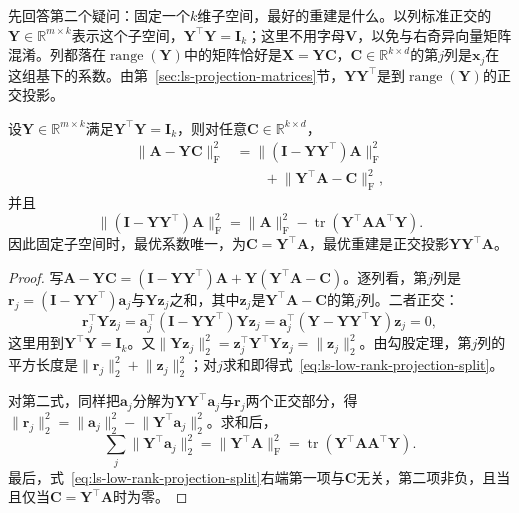 先回答第二个疑问：固定一个$k$维子空间，最好的重建是什么。以列标准正交的$\bm Y\in\mathbb R^{m\times k}$表示这个子空间，$\bm Y^\top\bm Y=\bm I_k$；这里不用字母$\bm V$，以免与右奇异向量矩阵混淆。列都落在$\operatorname{range}(\bm Y)$中的矩阵恰好是$\bm X=\bm Y\bm C$，$\bm C\in\mathbb R^{k\times d}$的第$j$列是$\bm x_j$在这组基下的系数。由第~\ref{sec:ls-projection-matrices}节，$\bm Y\bm Y^\top$是到$\operatorname{range}(\bm Y)$的正交投影。

\begin{lemma}[固定子空间时的正交误差分解]
\label{lem:ls-low-rank-projection-error}
设$\bm Y\in\mathbb R^{m\times k}$满足$\bm Y^\top\bm Y=\bm I_k$，则对任意$\bm C\in\mathbb R^{k\times d}$，
\begin{equation}
 \begin{aligned}
 \lVert\bm A-\bm Y\bm C\rVert_{\mathrm F}^2
 &=\lVert(\bm I-\bm Y\bm Y^\top)\bm A\rVert_{\mathrm F}^2\\
 &\qquad+\lVert\bm Y^\top\bm A-\bm C\rVert_{\mathrm F}^2,
 \end{aligned}
 \label{eq:ls-low-rank-projection-split}
\end{equation}
并且
\[
 \lVert(\bm I-\bm Y\bm Y^\top)\bm A\rVert_{\mathrm F}^2
 =\lVert\bm A\rVert_{\mathrm F}^2-\operatorname{tr}(\bm Y^\top\bm A\bm A^\top\bm Y).
\]
因此固定子空间时，最优系数唯一，为$\bm C=\bm Y^\top\bm A$，最优重建是正交投影$\bm Y\bm Y^\top\bm A$。
\end{lemma}
\begin{proof}
写$\bm A-\bm Y\bm C=(\bm I-\bm Y\bm Y^\top)\bm A+\bm Y(\bm Y^\top\bm A-\bm C)$。逐列看，第$j$列是$\bm r_j=(\bm I-\bm Y\bm Y^\top)\bm a_j$与$\bm Y\bm z_j$之和，其中$\bm z_j$是$\bm Y^\top\bm A-\bm C$的第$j$列。二者正交：
\[
 \bm r_j^\top\bm Y\bm z_j=\bm a_j^\top(\bm I-\bm Y\bm Y^\top)\bm Y\bm z_j
 =\bm a_j^\top(\bm Y-\bm Y\bm Y^\top\bm Y)\bm z_j=0 ,
\]
这里用到$\bm Y^\top\bm Y=\bm I_k$。又$\lVert\bm Y\bm z_j\rVert_2^2=\bm z_j^\top\bm Y^\top\bm Y\bm z_j=\lVert\bm z_j\rVert_2^2$。由勾股定理，第$j$列的平方长度是$\lVert\bm r_j\rVert_2^2+\lVert\bm z_j\rVert_2^2$；对$j$求和即得式~\eqref{eq:ls-low-rank-projection-split}。

对第二式，同样把$\bm a_j$分解为$\bm Y\bm Y^\top\bm a_j$与$\bm r_j$两个正交部分，得$\lVert\bm r_j\rVert_2^2=\lVert\bm a_j\rVert_2^2-\lVert\bm Y^\top\bm a_j\rVert_2^2$。求和后，
\[
 \sum_j\lVert\bm Y^\top\bm a_j\rVert_2^2=\lVert\bm Y^\top\bm A\rVert_{\mathrm F}^2
 =\operatorname{tr}(\bm Y^\top\bm A\bm A^\top\bm Y).
\]
最后，式~\eqref{eq:ls-low-rank-projection-split}右端第一项与$\bm C$无关，第二项非负，且当且仅当$\bm C=\bm Y^\top\bm A$时为零。
\end{proof}

